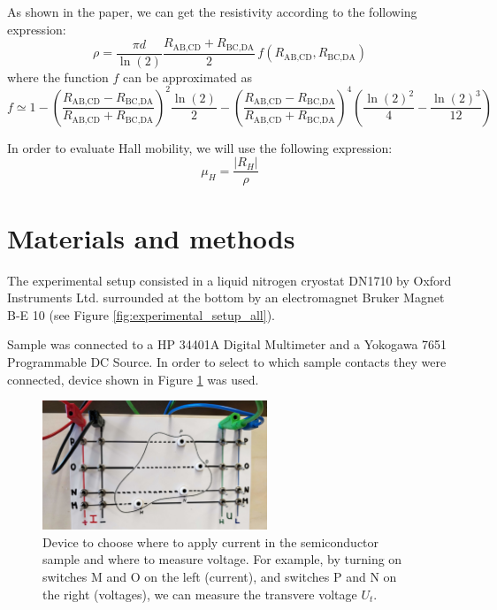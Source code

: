 \documentclass[11pt,a4paper]{article}
\begin{document}
As shown in the paper, we can get the resistivity according to the following expression:
\begin{equation}
\rho=\frac{\pi d}{\ln(2)}\frac{R_\text{AB,CD}+R_\text{BC,DA}}{2}\,f\!\left(R_\text{AB,CD},R_\text{BC,DA}\right)
\end{equation}
where the function $f$ can be approximated as
\begin{equation}
f \simeq 1-\left(\frac{R_\text{AB,CD}-R_\text{BC,DA}}{R_\text{AB,CD}+R_\text{BC,DA}}\right)^2 \frac{\ln(2)}{2}-\left(\frac{R_\text{AB,CD}-R_\text{BC,DA}}{R_\text{AB,CD}+R_\text{BC,DA}}\right)^4\left(\frac{\ln(2)^2}{4}-\frac{\ln(2)^3}{12}\right)
\end{equation}

In order to evaluate Hall mobility, we will use the following expression:
\begin{equation}
\mu_H=\frac{|R_H|}{\rho}
\end{equation}

\section{Materials and methods}

The experimental setup consisted in a liquid nitrogen cryostat DN1710 by Oxford Instruments Ltd. surrounded at the bottom by an electromagnet Bruker Magnet B-E 10 (see Figure \ref{fig:experimental_setup_all}).

Sample was connected to a HP 34401A Digital Multimeter and a Yokogawa 7651 Programmable DC Source. In order to select to which sample contacts they were connected, device shown in Figure \ref{fig:cables} was used.

\begin{figure}[H]
\centering
\includegraphics[width=0.6\textwidth]{Experimental_setup_cables}
\caption{Device to choose where to apply current in the semiconductor sample and where to measure voltage. For example, by turning on switches M and O on the left (current), and switches P and N on the right (voltages), we can measure the transvere voltage $U_t$.}
\label{fig:cables}
\end{figure}
\end{document}
